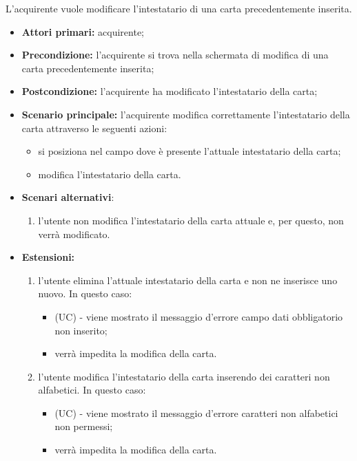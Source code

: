 L'acquirente vuole modificare l'intestatario di una carta precedentemente inserita.
\begin{itemize}
    \item \textbf{Attori primari:} acquirente;
    \item \textbf{Precondizione:} l'acquirente si trova nella schermata di modifica di una carta precedentemente inserita;
    \item \textbf{Postcondizione:} l'acquirente ha modificato l'intestatario della carta;
    \item \textbf{Scenario principale:} l'acquirente modifica correttamente l'intestatario della carta attraverso le seguenti azioni:
    \begin{itemize}
        \item si posiziona nel campo dove è presente l'attuale intestatario della carta;
        \item modifica l'intestatario della carta.
    \end{itemize}
    \item \textbf{Scenari alternativi}:
    \begin{enumerate}[label=\lett]
        \item l'utente non modifica l'intestatario della carta attuale e, per questo, non verrà modificato.
    \end{enumerate}
    \item \textbf{Estensioni:}
    \begin{enumerate}[label=\lett]
        \item l'utente elimina l'attuale intestatario della carta e non ne inserisce uno nuovo. In questo caso:
        \begin{itemize}
            \item (UC) - viene mostrato il messaggio d'errore campo dati obbligatorio non inserito;
            \item verrà impedita la modifica della carta.
        \end{itemize}
        \item l'utente modifica l'intestatario della carta inserendo dei caratteri non alfabetici. In questo caso:
        \begin{itemize}
            \item (UC) - viene mostrato il messaggio d'errore caratteri non alfabetici non permessi;
            \item verrà impedita la modifica della carta.
        \end{itemize}
    \end{enumerate}
\end{itemize}

